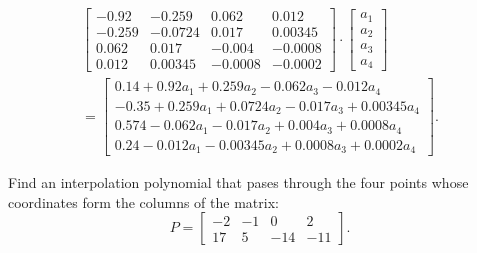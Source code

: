 \documentclass[12pt]{report}
\begin{document}
\begin{solution}
\[\begin{array}{c}
\begin{bmatrix}
            -0.92 & -0.259 & 0.062 & 0.012 \\
            -0.259 & -0.0724 & 0.017 & 0.00345 \\
            0.062 & 0.017 & -0.004 & -0.0008 \\
            0.012 & 0.00345 & -0.0008 & -0.0002
         \end{bmatrix}\cdot \begin{bmatrix}
            a_1 \\ a_2 \\ a_3 \\ a_4
         \end{bmatrix} \\[1cm]
         \displaystyle
         = \begin{bmatrix}
            0.14 + 0.92 a_1 + 0.259 a_2 -0.062 a_3 - 0.012 a_4\\
            -0.35 + 0.259a_1 + 0.0724a_2 - 0.017a_3 + 0.00345 a_4 \\
            0.574 - 0.062 a_1 - 0.017 a_2 + 0.004 a_3 + 0.0008 a_4 \\
            0.24 - 0.012 a_1 - 0.00345 a_2 + 0.0008 a_3 + 0.0002 a_4
         \end{bmatrix}.
      \end{array}
   \]
\end{solution}

\begin{problem}{}
    Find an interpolation polynomial that pases through the four points whose coordinates form the columns of the matrix:
    \[
         P = \begin{bmatrix}
            -2 & -1 & 0 & 2\\
            17 & 5 & -14 & -11
         \end{bmatrix}.
    \]
\end{problem}
\end{document}
